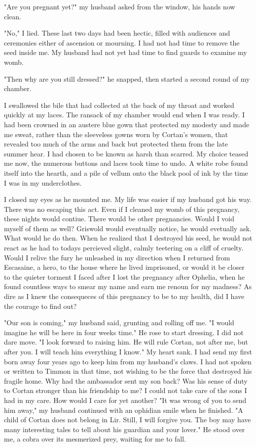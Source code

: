 \documentclass{article}
\begin{document}
"Are you pregnant yet?" my husband asked from the window, his hands now clean.

"No," I lied. These last two days had been hectic, filled with audiences and ceremonies either of ascension or mourning. I had not had time to remove the seed inside me. My husband had not yet had time to find guards to examine my womb. 

"Then why are you still dressed?" he snapped, then started a second round of my chamber.

I swallowed the bile that had collected at the back of my throat and worked quickly at my laces. The ransack of my chamber would end when I was ready. I had been crowned in an austere blue gown that protected my modesty and made me sweat, rather than the sleeveless gowns worn by Cortan's women, that revealed too much of the arms and back but protected them from the late summer hear. I had chosen to be known as harsh than scarred. My choice teased me now, the numerous buttons and laces took time to undo. A white robe found itself into the hearth, and a pile of vellum onto the black pool of ink by the time I was in my underclothes. 

I closed my eyes as he mounted me. My life was easier if my husband got his way. There was no escaping this act. Even if I cleaned my womb of this pregnancy, these nights would contiue. There would be  other pregnancies. Would I void myself of them as well? Griswold would eventually notice, he would evetually ask. What would he do then. When he realized that I destroyed his seed, he would not react as he had to todays percieved slight, calmly teetering on a cliff of cruelty. Would I relive the fury he unleashed in my direction when I returned from Escasaine, a hero, to the house where he lived imprisoned, or would it be closer to the quieter torment I faced after I lost the pregnancy after Ophelia, when he found countless ways to smear my name and earn me renoun for my madness? As dire as I knew the consequeces of this pregnancy to be to my health, did I have the courage to find out?

"Our son is coming," my husband said, grunting and rolling off me. "I would imagine he will be here in four weeks time." He rose to start dressing. I did not dare move. "I look forward to raising him. He will rule Cortan, not after me, but after you. I will teach him everything I know." My heart sank. I had send my first born away four years ago to keep him from my husband's claws. I had not spoken or written to Timmon in that time, not wishing to be the force that destroyed his fragile home. Why had the ambassador sent my son back? Was his sense of duty to Cortan stronger than his friendship to me? I could not take care of the sons I had in my care. How would I care for yet another? "It was wrong of you to send him away," my husband continued with an ophidian smile when he finished. "A child of Cortan does not belong in Lir. Still, I will forgive you. The boy may have many interesting tales to tell about his guardian and your lover." He stood over me, a cobra over its mesmerized prey, waiting for me to fall.
\end{document}
